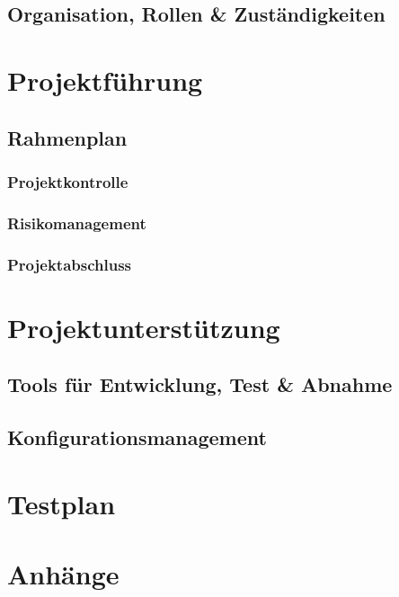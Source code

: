 \documentclass[a4paper, 10pt, fleqn]{article}
\begin{document}
\subsection{Organisation, Rollen \& Zuständigkeiten}
\section{Projektführung}
\subsection{Rahmenplan}
\subsubsection{Projektkontrolle}

\subsubsection{Risikomanagement}

\subsubsection{Projektabschluss}

\section{Projektunterstützung}
\subsection{Tools für Entwicklung, Test \& Abnahme}

\subsection{Konfigurationsmanagement}

\section{Testplan}


\section{Anhänge}
\end{document}
